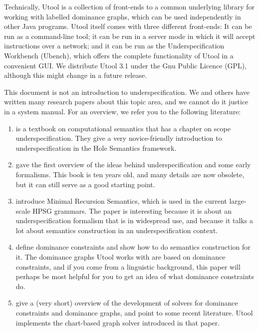Technically, Utool is a collection of front-ends to a common
underlying library for working with labelled dominance graphs, which
can be used independently in other Java programs.  Utool itself comes with three different front-ends: It can be run as a command-line tool; it can be run in a server mode in which it will accept instructions over a network; and it can be run as the Underspecification Workbench (Ubench), which offers the complete functionality of Utool in a convenient GUI. We distribute Utool 3.1 under the Gnu Public Licence
(GPL), although this might change in a future release.

This document is not an introduction to underspecification. We and
others have written many research papers about this topic area, and we
cannot do it justice in a system manual. For an overview, we refer you
to the following literature:
\begin{enumerate}
\item {} is a textbook on computational semantics that has a chapter on scope underspecification. They give a very novice-friendly introduction to underspecification in the Hole Semantics framework.
\item {} gave the first overview of the ideas
behind underspecification and some early formalisms. This book is ten
years old, and many details are now obsolete, but it can still serve
as a good starting point.
\item {} introduce Minimal Recursion Semantics, which
is used in the current large-scale HPSG grammars. The paper is
interesting because it is about an underspecification formalism that
is in widespread use, and because it talks a lot about semantics
construction in an underspecification context.
\item {} define dominance constraints and show how to do
semantics construction for it. The dominance graphs Utool works with
are based on dominance constraints, and if you come from a linguistic
background, this paper will perhaps be most helpful for you to get an
idea of what dominance constraints do.
\item {} give a (very short) overview of the
development of solvers for dominance constraints and dominance graphs,
and point to some recent literature. Utool implements the chart-based
graph solver introduced in that paper.
\end{enumerate}


